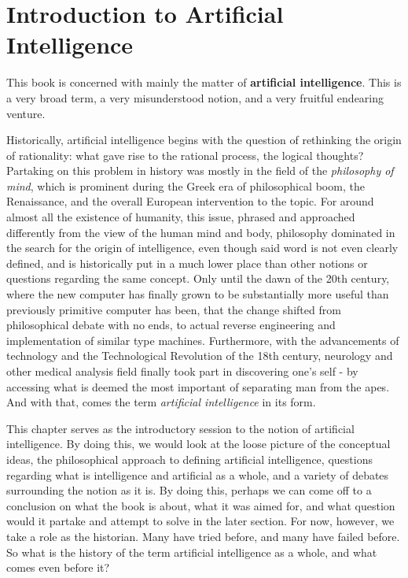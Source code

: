 \chapter{Introduction to Artificial Intelligence}
This book is concerned with mainly the matter of \textbf{artificial intelligence}. This is a very broad term, a very misunderstood notion, and a very fruitful endearing venture. 

Historically, artificial intelligence begins with the question of rethinking the origin of rationality: what gave rise to the rational process, the logical thoughts? Partaking on this problem in history was mostly in the field of the \textit{philosophy of mind}, which is prominent during the Greek era of philosophical boom, the Renaissance, and the overall European intervention to the topic. For around almost all the existence of humanity, this issue, phrased and approached differently from the view of the human mind and body, philosophy dominated in the search for the origin of intelligence, even though said word is not even clearly defined, and is historically put in a much lower place than other notions or questions regarding the same concept. Only until the dawn of the 20th century, where the new computer has finally grown to be substantially more useful than previously primitive computer has been, that the change shifted from philosophical debate with no ends, to actual reverse engineering and implementation of similar type machines. Furthermore, with the advancements of technology and the Technological Revolution of the 18th century, neurology and other medical analysis field finally took part in discovering one's self - by accessing what is deemed the most important of separating man from the apes. And with that, comes the term \textit{artificial intelligence} in its form. 

This chapter serves as the introductory session to the notion of artificial intelligence. By doing this, we would look at the loose picture of the conceptual ideas, the philosophical approach to defining artificial intelligence, questions regarding what is intelligence and artificial as a whole, and a variety of debates surrounding the notion as it is. By doing this, perhaps we can come off to a conclusion on what the book is about, what it was aimed for, and what question would it partake and attempt to solve in the later section. For now, however, we take a role as the historian. Many have tried before, and many have failed before. So what is the history of the term artificial intelligence as a whole, and what comes even before it? 

